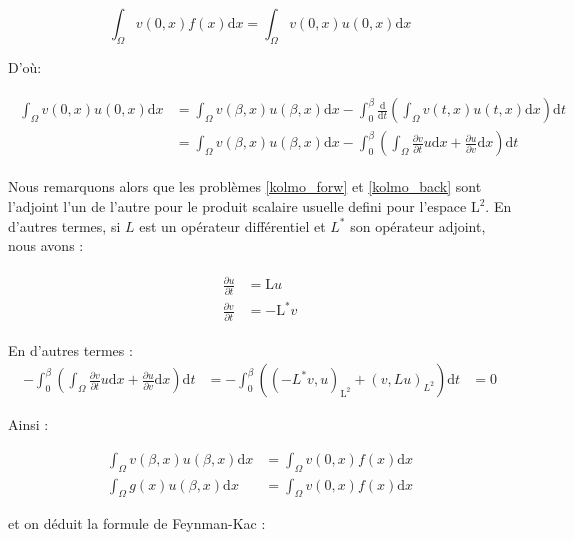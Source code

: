 \documentclass[11pt]{article}
\theoremstyle{definition}
\theoremstyle{remark}
\begin{document}
\begin{equation}
\int_{\Omega} v(0,x) f(x) \mathrm{d}x = \int_{\Omega} v(0,x) u(0,x) \mathrm{d}x
\end{equation}

D'où:

\begin{align}
\label{expansion_integral_vu}
\begin{split}
\int_{\Omega} v(0,x) u(0,x) \mathrm{d}x &= \int_{\Omega} v(\beta, x) u(\beta,x) \mathrm{d}x - \int_{0}^{\beta} \frac{\mathrm{d}}{\mathrm{d}t}\left(\int_{\Omega} v(t,x) u(t,x) \mathrm{d}x \right) \mathrm{d}t \\
&= \int_{\Omega} v(\beta, x) u(\beta,x) \mathrm{d}x - \int_{0}^{\beta} \left( \int_{\Omega} \frac{\partial v}{\partial t} u \mathrm{d}x + \frac{\partial u}{\partial v} \mathrm{d}x \right) \mathrm{d}t
\end{split}
\end{align}

Nous remarquons alors que les problèmes \eqref{kolmo_forw} et \eqref{kolmo_back} sont l'adjoint l'un de l'autre pour le produit scalaire usuelle defini pour l'espace $\mathrm{L}^2$. En d'autres termes, si $L$ est un opérateur différentiel et $L^{*}$ son opérateur adjoint, nous avons : 

\begin{align}
\label{adjoint_conditions}
\begin{split}
\frac{\partial u}{\partial t} &= \mathrm{L}u  \\
\frac{\partial v}{\partial t} &= -\mathrm{L}^{*}v
\end{split}
\end{align}

En d'autres termes :
\begin{align}
- \int_{0}^{\beta} \left( \int_{\Omega} \frac{\partial v}{\partial t} u \mathrm{d}x + \frac{\partial u}{\partial v} \mathrm{d}x \right) \mathrm{d}t &= 
- \int_{0}^{\beta} \left( (-L^{*}v,u)_{\mathrm{L}^2} + (v, Lu)_{L^2} \right) \mathrm{d}t &= 0
\end{align}

Ainsi :

\begin{align*}
\int_{\Omega} v(\beta, x) u(\beta, x) \mathrm{d}x &= \int_{\Omega} v(0,x) f(x) \mathrm{d}x \\
\int_{\Omega} g(x) u(\beta, x) \mathrm{d}x &= \int_{\Omega} v(0,x) f(x) \mathrm{d}x
\end{align*}

et on déduit la formule de Feynman-Kac : 
\end{document}
